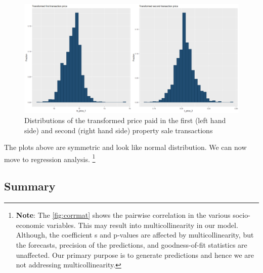 \documentclass[12pt]{article}
\begin{document}
\begin{figure}[H]
    \centering
    \includegraphics[width=18cm]{4. price vs socio-eco images/4t_normalplots.png}
    \caption{Distributions of the transformed price paid in the first (left hand side) and second (right hand side) property sale transactions}
    \label{fig:t_prices}
\end{figure}
The plots above are symmetric and look like normal distribution. We can now move to regression analysis.
\footnote{\textbf{Note}: The \autoref{fig:corrmat} shows the pairwise correlation in the various socio-economic variables. This may result into multicollinearity in our model. Although, the coefficient s and p-values are affected by multicollinearity, but the forecasts, precision of the predictions, and goodness-of-fit statistics are unaffected. Our primary purpose is to generate predictions and hence we are not addressing multicollinearity.}
\subsection{Summary}
\end{document}
